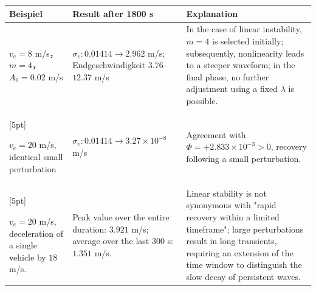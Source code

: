 \documentclass[11pt,a4paper,openany]{book}
\numberwithin{equation}{chapter}
\numberwithin{figure}{chapter}
\numberwithin{table}{chapter}
\begin{document}
\begin{center}
\small
{}
\label{tab:e11-nonlinear}
\begin{tabular}{p{4.0cm}p{4.3cm}p{5.4cm}}
\toprule
\textbf{Beispiel} & \textbf{Result after 1800 s} & \textbf{Explanation} \\
\midrule
$v_e=8$ m/s，$m=4$，$A_0=0.02$ m/s &




 $\sigma_v:0.01414\to2.962$ m/s; Endgeschwindigkeit $3.76$–$12.37$ m/s




&In the case of linear instability, $m=4$ is selected initially; subsequently, nonlinearity leads to a steeper waveform; in the final phase, no further adjustment using a fixed $\lambda$ is possible.





\\

[5pt]

$v_e=20$ m/s, identical small perturbation






& $\sigma_v:0.01414\to3.27\times10^{-8}$ m/s &






Agreement with $\Phi=+2.833\times10^{-3}>0$, recovery following a small perturbation.





\\

[5pt]

$v_e=20$ m/s, deceleration of a single vehicle by $18$ m/s.






&






Peak value over the entire duration: $3.921$ m/s; average over the last 300 s: $1.351$ m/s.






&






Linear stability is not synonymous with "rapid recovery within a limited timeframe"; large perturbations result in long transients, requiring an extension of the time window to distinguish the slow decay of persistent waves.





\\
\bottomrule
\end{tabular}
\end{center}
\end{document}
